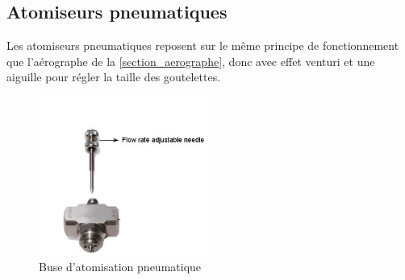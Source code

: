 \subsection{Atomiseurs pneumatiques}
Les atomiseurs pneumatiques reposent sur le même principe de fonctionnement que l'aérographe de la \autoref{section_aerographe}, donc avec effet
venturi et une aiguille pour régler la taille des goutelettes.
\begin{figure}[H]
    \centering
    \includegraphics[width=0.5\textwidth]{assets/figures/etat_art/atomizing_nozzle.jpg}
    \caption[Buse d'atomisation pneumatique]{Buse d'atomisation pneumatique \autocite{photo_buse_atomisation}\footnotemark}
\end{figure}

